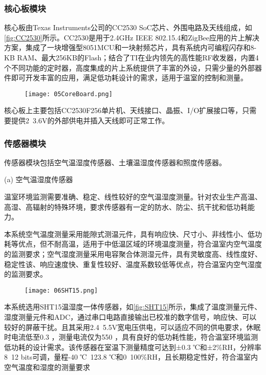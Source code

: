 		\subsubsection{核心板模块}
		核心板由Texas Instruments公司的CC2530 SoC芯片、外围电路及天线组成，如\ref{fig:CC2530}所示。CC2530是用于2.4GHz IEEE 802.15.4和ZigBee应用的片上解决方案，集成了一块增强型8051MCU和一块射频芯片，具有系统内可编程闪存和8-KB RAM、最大256KB的Flash；结合了TI在业内领先的高性能RF收发器，内置4个不同功能的定时器，高度集成的片上系统提供了丰富的外设，只需少量的外部器件即可开发丰富的应用，满足低功耗设计的需求，适用于温室的控制和测量。
		\begin{figure}[!htp]
  			\centering
 			\texttt{[image: 05CoreBoard.png]}
		\end{figure}	
		核心板上主要包括CC2530F256单片机、天线接口、晶振、I/O扩展接口等，只需要提供2~3.6V的外部供电并插入天线即可正常工作。
		\subsubsection{传感器模块}
		传感器模块包括空气温湿度传感器、土壤温湿度传感器和照度传感器。
		
		(a) 空气温湿度传感器
		
		温室环境监测需要准确、稳定、线性较好的空气温湿度测量。针对农业生产高温、高湿、高辐射的特殊环境，要求传感器有一定的防水、防尘、抗干扰和低功耗能力。
		
		本系统空气温度测量采用能隙式测温元件，具有响应快、尺寸小、非线性小、低功耗等优点，但不耐高温，适用于中低温区域的环境温度测量，符合温室内空气温度的监测要求；空气湿度测量采用电容聚合体测湿元件，具有灵敏度高、线性度好、稳定性该、响应速度快、重复性较好、温度系数较低等优点，符合温室内空气湿度的监测要求。
 		\begin{figure}[!htp]
  			\centering
 			\texttt{[image: 06SHT15.png]}
		\end{figure}
		本系统选用SHT15温湿度一体传感器，如\ref{fig:SHT15}所示，集成了温度测量元件、湿度测量元件和ADC，通过串口电路直接输出已校准的数字信号，响应快、可以较好的屏蔽干扰。且其采用2.4~5.5V宽电压供电，可以适应不同的供电要求，休眠时电流低至0.3 ，测量电流仅为550 ，具有良好的低功耗性能，符合温室环境监测低功耗的设计需求。该传感器在室温下测量精度可达到±0.3 ℃和±2\%RH，分辨率8~12 bits可调，量程-40 ℃~123.8 ℃和0~100\%RH，且长期稳定性好，符合温室内空气温度和湿度的测量要求
		
